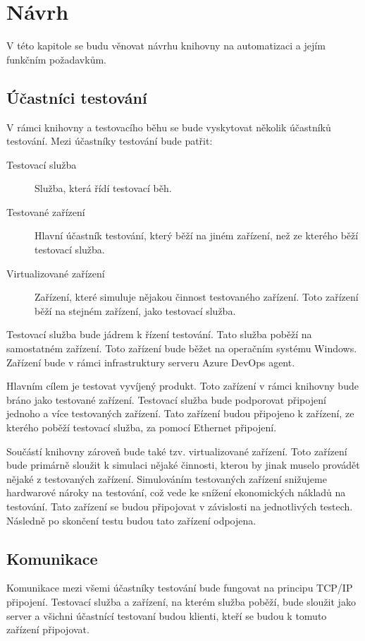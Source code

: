 \chapter{Návrh}

V této kapitole se budu věnovat návrhu knihovny na automatizaci a jejím funkčním požadavkům.

\section{Účastníci testování}
V rámci knihovny a testovacího běhu se bude vyskytovat několik účastníků testování. Mezi účastníky testování bude patřit:

\begin{description}
    \item[Testovací služba] Služba, která řídí testovací běh.
    \item[Testované zařízení] Hlavní účastník testování, který běží na jiném zařízení, než ze kterého běží testovací služba. 
    \item[Virtualizované zařízení] Zařízení, které simuluje nějakou činnost testovaného zařízení. Toto zařízení běží na stejném zařízení, jako testovací služba. 
\end{description}

Testovací služba bude jádrem k řízení testování. Tato služba poběží na samostatném zařízení. Toto zařízení bude běžet na operačním systému Windows. Zařízení bude v rámci infrastruktury serveru Azure DevOps agent. 

Hlavním cílem je testovat vyvíjený produkt. Toto zařízení v rámci knihovny bude bráno jako testované zařízení. Testovací služba bude podporovat připojení jednoho a více testovaných zařízení. Tato zařízení budou připojeno k zařízení, ze kterého poběží testovací služba, za pomocí Ethernet připojení. 

Součástí knihovny zároveň bude také tzv. virtualizované zařízení. Toto zařízení bude primárně sloužit k simulaci nějaké činnosti, kterou by jinak muselo provádět nějaké z testovaných zařízení. Simulováním testovaných zařízení snižujeme hardwarové nároky na testování, což vede ke snížení ekonomických nákladů na testování. Tato zařízení se budou připojovat v závislosti na jednotlivých testech. Následně po skončení testu budou tato zařízení odpojena.

\section{Komunikace}
Komunikace mezi všemi účastníky testování bude fungovat na principu TCP/IP připojení. Testovací služba a zařízení, na kterém služba poběží, bude sloužit jako server a všichni účastnící testovaní budou klienti, kteří se budou k tomuto zařízení připojovat. 

